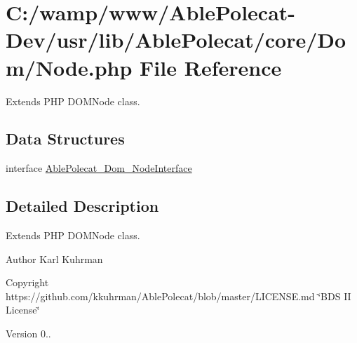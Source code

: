 \hypertarget{_node_8php}{}\section{C\+:/wamp/www/\+Able\+Polecat-\/\+Dev/usr/lib/\+Able\+Polecat/core/\+Dom/\+Node.php File Reference}
\label{_node_8php}


Extends P\+H\+P D\+O\+M\+Node class.  


\subsection*{Data Structures}
\begin{DoxyCompactItemize}
\item 
interface \hyperlink{interface_able_polecat___dom___node_interface}{Able\+Polecat\+\_\+\+Dom\+\_\+\+Node\+Interface}
\end{DoxyCompactItemize}


\subsection{Detailed Description}
Extends P\+H\+P D\+O\+M\+Node class. 

\begin{DoxyAuthor}{Author}
Karl Kuhrman 
\end{DoxyAuthor}
\begin{DoxyCopyright}{Copyright}
https\+://github.com/kkuhrman/\+Able\+Polecat/blob/master/\+L\+I\+C\+E\+N\+S\+E.\+md \char`\"{}\+B\+D\+S I\+I License\char`\"{} 
\end{DoxyCopyright}
\begin{DoxyVersion}{Version}
0.. 
\end{DoxyVersion}
